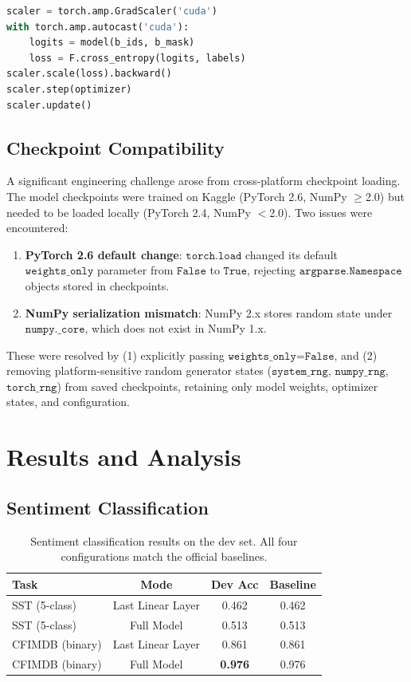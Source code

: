 \documentclass[11pt,a4paper]{article}
\begin{document}
\begin{lstlisting}[language=Python]
scaler = torch.amp.GradScaler('cuda')
with torch.amp.autocast('cuda'):
    logits = model(b_ids, b_mask)
    loss = F.cross_entropy(logits, labels)
scaler.scale(loss).backward()
scaler.step(optimizer)
scaler.update()
\end{lstlisting}

\subsection{Checkpoint Compatibility}

A significant engineering challenge arose from cross-platform checkpoint loading. The model checkpoints were trained on Kaggle (PyTorch 2.6, NumPy $\geq$2.0) but needed to be loaded locally (PyTorch 2.4, NumPy $<$2.0). Two issues were encountered:
\begin{enumerate}[nosep]
  \item \textbf{PyTorch 2.6 default change}: $\texttt{torch.load}$ changed its default $\texttt{weights\_only}$ parameter from $\texttt{False}$ to $\texttt{True}$, rejecting $\texttt{argparse.Namespace}$ objects stored in checkpoints.
  \item \textbf{NumPy serialization mismatch}: NumPy 2.x stores random state under $\texttt{numpy.\_core}$, which does not exist in NumPy 1.x.
\end{enumerate}
These were resolved by (1) explicitly passing $\texttt{weights\_only=False}$, and (2) removing platform-sensitive random generator states ($\texttt{system\_rng}$, $\texttt{numpy\_rng}$, $\texttt{torch\_rng}$) from saved checkpoints, retaining only model weights, optimizer states, and configuration.

\section{Results and Analysis}

\subsection{Sentiment Classification}

\begin{table}[H]
\centering
\begin{tabular}{lccc}
\toprule
\textbf{Task} & \textbf{Mode} & \textbf{Dev Acc} & \textbf{Baseline} \\
\midrule
SST (5-class) & Last Linear Layer & 0.462 & 0.462 \\
SST (5-class) & Full Model & 0.513 & 0.513 \\
CFIMDB (binary) & Last Linear Layer & 0.861 & 0.861 \\
CFIMDB (binary) & Full Model & \textbf{0.976} & 0.976 \\
\bottomrule
\end{tabular}
\caption{Sentiment classification results on the dev set. All four configurations match the official baselines.}
\label{tab:sent-results}
\end{table}
\end{document}
